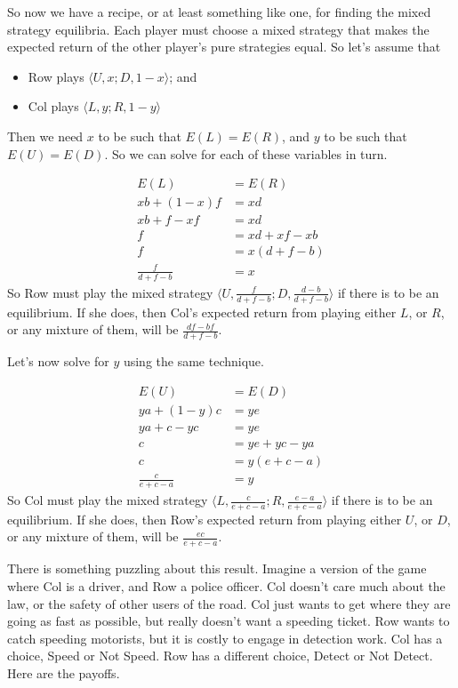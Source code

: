 \documentclass[openany]{book}
\begin{document}
So now we have a recipe, or at least something like one, for finding the mixed strategy equilibria. Each player must choose a mixed strategy that makes the expected return of the other player's pure strategies equal. So let's assume that

\begin{itemize}
\item Row plays $\langle U, x; D, 1-x \rangle$; and
\item Col plays $\langle L, y; R, 1-y \rangle$
\end{itemize}
Then we need $x$ to be such that $E(L) = E(R)$, and $y$ to be such that $E(U) = E(D)$. So we can solve for each of these variables in turn.

\begin{align*}
E(L) &= E(R) \\
xb + (1-x)f &= xd \\
xb + f - xf &= xd \\
f &= xd + xf - xb \\
f &= x(d + f -b) \\
\frac{f}{d + f - b} &= x
\end{align*}
So Row must play the mixed strategy $\langle U, \frac{f}{d + f - b}; D, \frac{d-b}{d + f - b} \rangle$ if there is to be an equilibrium. If she does, then Col's expected return from playing either $L$, or $R$, or any mixture of them, will be $\frac{df - bf}{d + f - b}$.

Let's now solve for $y$ using the same technique.

\begin{align*}
E(U) &= E(D) \\
ya + (1-y)c &= ye \\
ya + c - yc &= ye \\
c &= ye + yc - ya \\
c &= y(e + c - a) \\
\frac{c}{e + c - a} &= y
\end{align*}
So Col must play the mixed strategy $\langle L, \frac{c}{e + c - a}; R, \frac{e-a}{e + c - a} \rangle$ if there is to be an equilibrium. If she does, then Row's expected return from playing either $U$, or $D$, or any mixture of them, will be $\frac{ec}{e + c - a}$.

There is something puzzling about this result. Imagine a version of the game where Col is a driver, and Row a police officer. Col doesn't care much about the law, or the safety of other users of the road. Col just wants to get where they are going as fast as possible, but really doesn't want a speeding ticket. Row wants to catch speeding motorists, but it is costly to engage in detection work. Col has a choice, Speed or Not Speed. Row has a different choice, Detect or Not Detect. Here are the payoffs.
\end{document}
